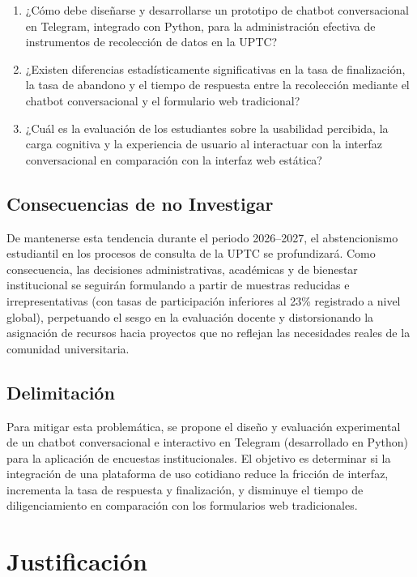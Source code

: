 \documentclass[12pt,letterpaper]{article}
\begin{document}
\begin{enumerate}
    \item ¿Cómo debe diseñarse y desarrollarse un prototipo de chatbot conversacional en Telegram, integrado con Python, para la administración efectiva de instrumentos de recolección de datos en la UPTC?
    \item ¿Existen diferencias estadísticamente significativas en la tasa de finalización, la tasa de abandono y el tiempo de respuesta entre la recolección mediante el chatbot conversacional y el formulario web tradicional?
    \item ¿Cuál es la evaluación de los estudiantes sobre la usabilidad percibida, la carga cognitiva y la experiencia de usuario al interactuar con la interfaz conversacional en comparación con la interfaz web estática?
\end{enumerate}

\subsection{Consecuencias de no Investigar}
De mantenerse esta tendencia durante el periodo 2026--2027, el abstencionismo estudiantil en los procesos de consulta de la UPTC se profundizará. Como consecuencia, las decisiones administrativas, académicas y de bienestar institucional se seguirán formulando a partir de muestras reducidas e irrepresentativas (con tasas de participación inferiores al 23\% registrado a nivel global), perpetuando el sesgo en la evaluación docente y distorsionando la asignación de recursos hacia proyectos que no reflejan las necesidades reales de la comunidad universitaria.

\subsection{Delimitación}
Para mitigar esta problemática, se propone el diseño y evaluación experimental de un chatbot conversacional e interactivo en Telegram (desarrollado en Python) para la aplicación de encuestas institucionales. El objetivo es determinar si la integración de una plataforma de uso cotidiano reduce la fricción de interfaz, incrementa la tasa de respuesta y finalización, y disminuye el tiempo de diligenciamiento en comparación con los formularios web tradicionales.

\section{Justificación}
\end{document}
